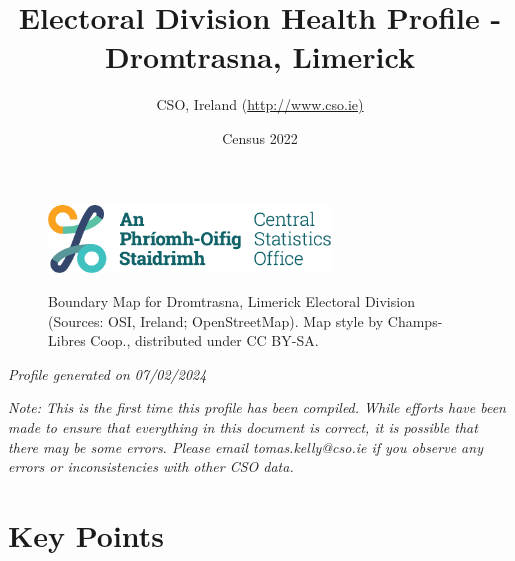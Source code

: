 \documentclass{article}
\title{Electoral Division Health Profile - Dromtrasna, Limerick}
\date{Census 2022}
\author{CSO, Ireland  (\url{http://www.cso.ie)}}
\begin{document}


\begin{figure}
	\centering
\includegraphics[width =75mm]{../figures/CSO_Logo.png}
\end{figure}

\begin{figure}[h]
	\centering
	\setlength{\fboxsep}{1pt}
	\caption{\normalsize Boundary Map for Dromtrasna, Limerick Electoral Division (Sources: OSI, Ireland; OpenStreetMap). Map style by Champs-Libres Coop., distributed under CC BY-SA.}
	\label{fig:2ae19629-1a6a-13a3-e055-000000000001}
	\end{figure}
	{\let\newpage\relax\maketitle}
	     \begin{center}
         \emph{Profile generated on 07/02/2024}
     \end{center}
     	     \begin{center}
        \emph{Note: This is the first time this profile has been compiled. While efforts have been made to ensure that everything in this document is correct, it is possible that there may be some errors. Please email tomas.kelly@cso.ie if you observe any errors or inconsistencies with other CSO data.}
     \end{center}
  \pagebreak
    	    \tableofcontents

\pagebreak


\section{Key Points}
\end{document}
